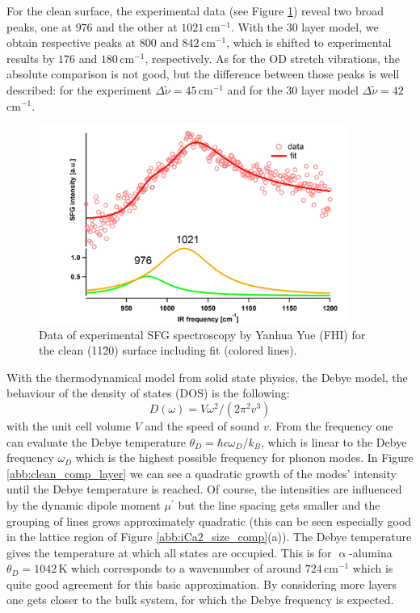\documentclass[11pt,DIV=13,BCOR=5mm,a4paper,headinclude]{scrbook}
\begin{document}
For the clean surface, the experimental data (see Figure \ref{abb:exp-sfg_clean}) reveal two broad peaks, one at $976$ and the other at $1021\,$cm$^{-1}$.
With the 30 layer model, we obtain respective peaks at $800$ and $842\,$cm$^{-1}$, which is shifted to experimental results by $176$ and $180\,$cm$^{-1}$, respectively.
As for the OD stretch vibrations, the absolute comparison is not good, but the difference between those peaks is well described: for the experiment $\Delta \tilde{\nu}=45\,$cm$^{-1}$ and for the 30 layer model $\Delta \tilde{\nu}=42\,$cm$^{-1}$.
\begin{figure}[!ht]
 \centering
\includegraphics[width=0.9\textwidth]{figures/11-20/ssp_UHV_800K_fit_clean.jpg}
 \caption{Data of experimental SFG spectroscopy by Yanhua Yue (FHI) for the clean (11\=20) surface including fit (colored lines).}
        \label{abb:exp-sfg_clean}
 \end{figure}




With the thermodynamical model from solid state physics, the Debye model, the behaviour of the density of states (DOS) is the following\cite{kittel2002}:
\begin{equation}
 D(\omega)=V\omega^2/(2\pi^2v^3)
\end{equation}
with the unit cell volume $V$ and the speed of sound $v$.
From the frequency one can evaluate the Debye temperature $\theta_D=\hbar c \omega_D/k_B$, which is linear to the Debye frequency $\omega_D$ which is the highest possible frequency for phonon modes.
In Figure \ref{abb:clean_comp_layer} we can see a quadratic growth of the modes' intensity until the Debye temperature is reached.
Of course, the intensities are influenced by the dynamic dipole moment $\mu^\prime$ but the line spacing gets smaller and the grouping of lines grows approximately quadratic (this can be seen especially good in the lattice region of Figure \ref{abb:iCa2_size_comp}(a)).
The Debye temperature gives the temperature at which all states are occupied.
This is for $\upalpha$-alumina $\theta_D=1042\,$K which corresponds to a wavenumber of around $724\,$cm$^{-1}$\cite{Goto1989} which is quite good agreement for this basic approximation.
By considering more layers one gets closer to the bulk system, for which the Debye frequency is expected.
\\
\end{document}
